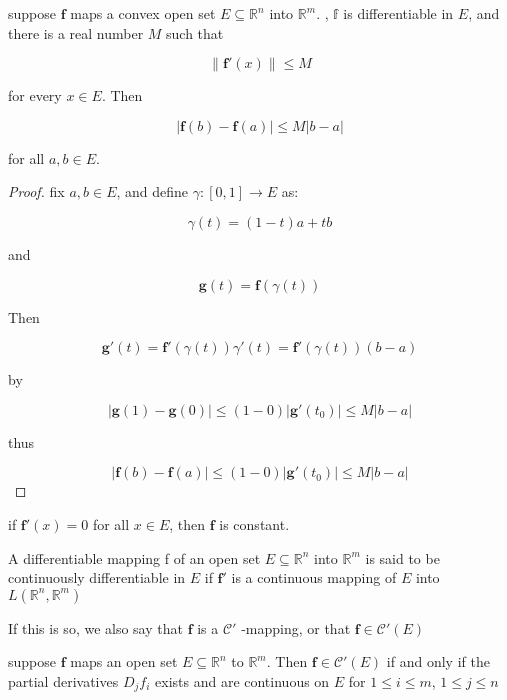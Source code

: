\begin{thm}
    \label{thm:e718cb8c-0fc2-4cba-89f3-3db78500fbc2}
    suppose $\mathbf{f}$ maps a convex open set $E \subseteq \mathbb{R}^n$ into $\mathbb{R}^m$.
    , $\mathbb{f}$ is differentiable in $E$, and there is a real number $M$ such that

    \[
        \| \mathbf{f}'(x)\| \le M
    \]

    for every $x \in E$. Then

    \[
        \left| \mathbf{f}(b) - \mathbf{f}(a) \right| \le M |b-a|
    \]

    for all $a,b \in E$.
\end{thm}

\begin{proof}
    fix $a,b \in E$, and define $\gamma: [0,1] \to E$ as:

    \[
        \gamma(t) = (1-t)a + tb
    \]

    and

    \[
        \mathbf{g}(t) = \mathbf{f}(\gamma(t))
    \]

    Then

    \[
        \mathbf{g}'(t) = \mathbf{f}'(\gamma(t))\gamma'(t) = \mathbf{f}'(\gamma(t))(b-a)
    \]

    by

    \[
        \left|\mathbf{g}(1) -\mathbf{g}(0) \right| \le (1-0) \left| \mathbf{g}'(t_0)\right| \le M \left| b-a \right|
    \]

    thus


    \[
        \left|\mathbf{f}(b) - \mathbf{f}(a) \right| \le (1-0) \left| \mathbf{g}'(t_0)\right| \le M \left| b-a \right|
    \]
\end{proof}

\begin{corollary}
    if $\mathbf{f}'(x) = 0$ for all $x \in E$, then $\mathbf{f}$ is constant.
\end{corollary}

\begin{definition}
    A differentiable mapping f of an open set $E \subseteq \mathbb{R}^n$ into $\mathbb{R}^m$ is
said to be continuously differentiable in $E$ if $\mathbf{f}'$ is a continuous mapping of $E$
into $L(\mathbb{R}^n, \mathbb{R}^m)$

If this is so, we also say that $\mathbf{f}$ is a $\mathscr{C}'$ -mapping, or that $\mathbf{f} \in \mathscr{C}'(E)$
\end{definition}

\begin{thm}
    suppose $\mathbf{f}$ maps an open set $E \subseteq \mathbb{R}^n$ to $\mathbb{R}^m$.
    Then $\mathbf{f} \in \mathscr{C}'(E)$ if and only if the partial derivatives $D_jf_i$ exists and are continuous
    on $E$ for $1 \le i \le m$, $1 \le j \le n$
\end{thm}

